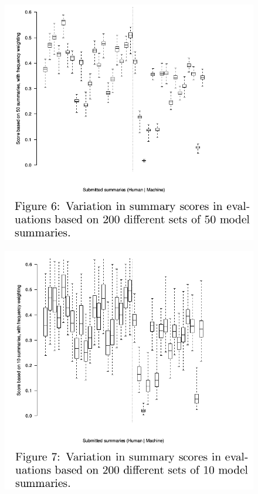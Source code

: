 \documentclass[xcolor={table}]{beamer}
\begin{document}
\begin{frame}[t]{\cite{teufel2004evaluating}}
      \begin{figure}[h]
          \centering
      \includegraphics[scale=.25]{images/figure6-teufel04.png} \\
  \end{figure}
\end{frame}
\begin{frame}[t]{\cite{teufel2004evaluating}}
      \begin{figure}[h]
          \centering
      \includegraphics[scale=.25]{images/figure7-teufel04.png} \\
  \end{figure}
\end{frame}
\end{document}
